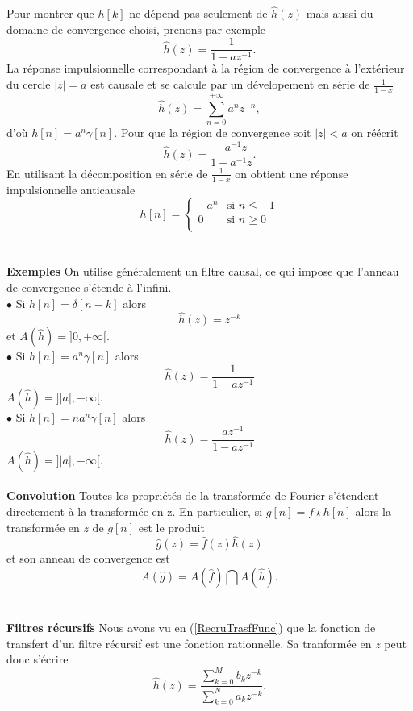 Pour montrer que
$h[k]$ ne d\'epend pas seulement de
$\hat h(z)$ mais aussi du domaine de convergence choisi,
prenons par exemple
\[
\hat h(z) = \frac 1 {1 - a z^{-1}} .
\]
La r\'eponse impulsionnelle correspondant \`a la r\'egion de
convergence \`a l'ext\'erieur du cercle
$|z| = a$ est causale et se calcule par un d\'evelopement
en s\'erie de $\frac 1 {1 - x}$
\[
\hat h(z) = \sum_{n=0}^{+\infty} a^n z^{-n} ,
\]
d'o\`u $h[n] = a^n \gamma[n]$.
Pour que la r\'egion de convergence soit $|z| < a$ on
r\'e\'ecrit
\[
\hat h(z) = \frac {-a^{-1} z} {1 - a^{-1}z} .
\]
En utilisant la d\'ecomposition en s\'erie de $\frac 1 {1-x}$
on obtient une r\'eponse impulsionnelle anticausale
\[
h[n] = \left\{
\begin{array}{ll}
-a^n & \mbox{si $n \leq -1$}\\
0 & \mbox{si $n \geq 0$}\\
\end{array}
\right.
\]
\\
\\
{\bf Exemples}
On utilise g\'en\'eralement un filtre causal, ce qui
impose que l'anneau de convergence s'\'etende \`a l'infini.\\
$\bullet$ Si $h[n] = \delta [n-k]$ alors
\begin{equation}
\label{transl-z}
\hat h(z) = z^{-k}
\end{equation}
et $A(\hat h) = ]0 , +\infty [$.\\
$\bullet$ Si $h[n] = a^n \gamma [n]$ alors
\begin{equation}
\label{un-pole2}
\hat h(z) = \frac 1 {1 - a z^{-1}}
\end{equation}
$A(\hat h) = ]|a| , +\infty [$.\\
$\bullet$ Si $h[n] = n a^n \gamma [n]$ alors
\[
\hat h(z) = \frac {a z^{-1}} {1 - a z^{-1}}
\]
$A(\hat h) = ]|a| , +\infty [$.
\\
\\
{\bf Convolution} Toutes
les propri\'et\'es de la transform\'ee
de Fourier s'\'etendent directement
\`a la transform\'ee en z.
En particulier, si $g[n] = f \star h [n]$ alors la transform\'ee
en $z$ de $g[n]$ est le produit
\[
\hat g(z) = \hat f(z) \hat h(z)
\]
et son anneau de convergence est
\[
A(\hat g) = A(\hat f ) \bigcap A(\hat h ) .
\]
\\
\\
{\bf Filtres r\'ecursifs}
Nous avons vu en (\ref{RecruTrasfFunc}) que la fonction de
transfert d'un filtre r\'ecursif
est une fonction rationnelle. Sa tranform\'ee en $z$ peut
donc s'\'ecrire
\[
\hat h(z) =
\frac {\sum_{k=0}^M b_k z^{-k}} {\sum_{k=0}^N a_k z^{-k} }.
\]
